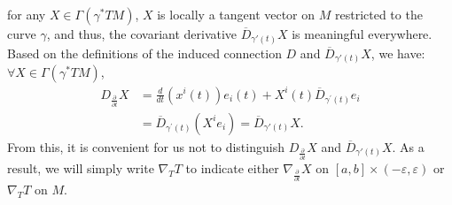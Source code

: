 \documentclass{ctexart}
\begin{document}
for any $X \in \Gamma(\gamma^* TM)$, $X$ is locally a tangent vector on $M$ restricted to the curve $\gamma$, and thus, 
the covariant derivative $\overline{D}_{\gamma'(t)} X$ is meaningful everywhere. Based on the definitions of the induced connection $D$ and 
$\overline{D}_{\gamma'(t)} X$, we have: $\forall X \in \Gamma(\gamma^* TM)$, 
\begin{align*}
  D_{\frac{\partial}{\partial t}} X 
  &=\frac{d}{dt}\left(x^i(t)\right)e_i(t)+X^i(t)\overline{D}_{\gamma^\prime(t)}e_i \\
  &=\overline{D}_{\gamma^\prime(t)}(X^ie_i) = \overline{D}_{\gamma'(t)} X.
\end{align*}
From this, it is convenient for us not to distinguish $D_{\frac{\partial}{\partial t}} X$ and $\overline{D}_{\gamma'(t)} X$. As a result, we will simply write
$\nabla_T T$ to indicate either $\nabla_{\frac{\partial}{\partial t}}X$ on $[a,b]\times (-\varepsilon,\varepsilon)$ or $\nabla_T T$ on $M$. 



\end{document}
